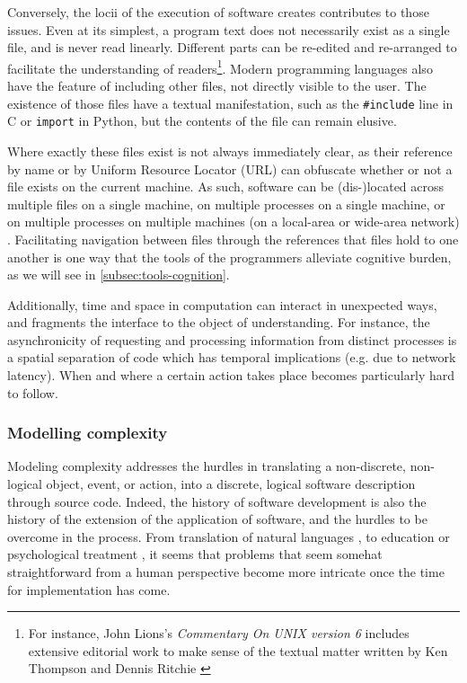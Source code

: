 Conversely, the locii of the execution of software creates contributes to those issues. Even at its simplest, a program text does not necessarily exist as a single file, and is never read linearly. Different parts can be re-edited and re-arranged to facilitate the understanding of readers\footnote{For instance, John Lions's \emph{Commentary On UNIX version 6} includes extensive editorial work to make sense of the textual matter written by Ken Thompson and Dennis Ritchie \citep{lions_lions_1996}}. Modern programming languages also have the feature of including other files, not directly visible to the user. The existence of those files have a textual manifestation, such as the \lstinline{#include} line in C or \lstinline{import} in Python, but the contents of the file can remain elusive.

Where exactly these files exist is not always immediately clear, as their reference by name or by Uniform Resource Locator (URL) can obfuscate whether or not a file exists on the current machine. As such, software can be (dis-)located across multiple files on a single machine, on multiple processes on a single machine, or on multiple processes on multiple machines (on a local-area or wide-area network) \citep{berry_philosophy_2011}. Facilitating navigation between files through the references that files hold to one another is one way that the tools of the programmers alleviate cognitive burden, as we will see in \autoref{subsec:tools-cognition}.

Additionally, time and space in computation can interact in unexpected ways, and fragments the interface to the object of understanding. For instance, the asynchronicity of requesting and processing information from distinct processes is a spatial separation of code which has temporal implications (e.g. due to network latency). When and where a certain action takes place becomes particularly hard to follow.

\subsubsection{Modelling complexity}
\label{subsubsec:modelling-complexity}

Modeling complexity addresses the hurdles in translating a non-discrete, non-logical object, event, or action, into a discrete, logical software description through source code. Indeed, the history of software development is also the history of the extension of the application of software, and the hurdles to be overcome in the process. From translation of natural languages \citep{poibeau_machine_2017}, to education \citep{watters_teaching_2021} or psychological treatment \citep{weizenbaum_computer_1976}, it seems that problems that seem somehat straightforward from a human perspective become more intricate once the time for implementation has come.

